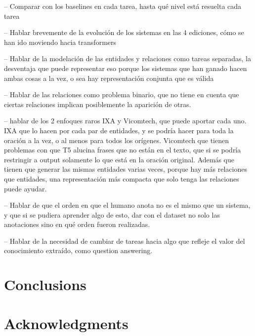 \documentclass[a4paper,11pt,twocolumn,twoside]{article}
\begin{document}
-- Comparar con los baselines en cada tarea, hasta qué nivel está resuelta cada tarea

-- Hablar brevemente de la evolución de los sistemas en las 4 ediciones,
cómo se han ido moviendo hacia transformers

-- Hablar de la modelación de las entidades y relaciones como tareas separadas,
la desventaja que puede representar eso porque los sistemas que han ganado hacen
ambas cosas a la vez, o sea hay representación conjunta que es válida

-- Hablar de las relaciones como problema binario, que no tiene en cuenta que ciertas
relaciones implican posiblemente la aparición de otras.

-- hablar de los 2 enfoques raros IXA y Vicomtech, que puede aportar cada uno. IXA que lo hacen por cada par de entidades, y se podría hacer para toda la oración a la vez, o al menos para todos los orígenes. Vicomtech que tienen problemas con que T5 alucina frases que no están en el texto, que si se podría restringir a output solamente lo que está en la oración original. Además que tienen que generar las mismas entidades varias veces, porque hay más relaciones que entidades, una representación más compacta que solo tenga las relaciones puede ayudar.

-- Hablar de que el orden en que el humano anota no es el mismo que un sistema,
y que si se pudiera aprender algo de esto, dar con el dataset no solo las anotaciones
sino en qué orden fueron realizadas.

-- Hablar de la necesidad de cambiar de tareas hacia algo que refleje el valor
del conocimiento extraído, como question answering.

\section{Conclusions}\label{sec:conclusions}

\section*{Acknowledgments}



\end{document}

